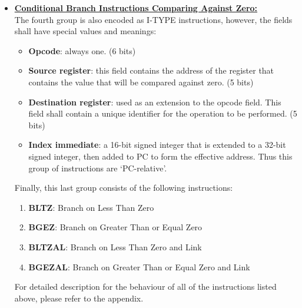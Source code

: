 \documentclass[]{scrartcl}
\begin{document}
\begin{itemize}
\item \textbf{\underline{Conditional Branch Instructions 
                         Comparing Against Zero:}} \\

The fourth group is also encoded as I-TYPE instructions,
however, the fields shall have special values and meanings:

\begin{itemize}

\item \textbf{Opcode}: always one. (6 bits)

\item \textbf{Source register}: this field contains the address of the
                                register that contains the value
                                that will be compared against zero. (5 bits)

\item \textbf{Destination register}: used as an extension to the opcode field.
                                     This field shall contain a unique
                                     identifier for the operation to be
                                     performed. (5 bits)

\item \textbf{Index immediate}: a 16-bit signed integer that is extended
                                to a 32-bit signed integer, then added
                                to PC to form the effective address. Thus
                                this group of instructions are `PC-relative'.

\end{itemize}

Finally, this last group consists of the following instructions:

\begin{enumerate}

\item \textbf{BLTZ}:   Branch on Less Than Zero
\item \textbf{BGEZ}:   Branch on Greater Than or Equal Zero
\item \textbf{BLTZAL}: Branch on Less Than Zero and Link
\item \textbf{BGEZAL}: Branch on Greater Than or Equal Zero and Link

\end{enumerate}

For detailed description for the behaviour of all of the instructions listed
above, please refer to the appendix.

\end{itemize}
\end{document}
